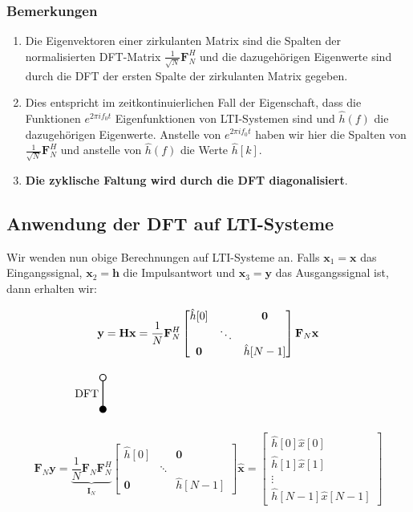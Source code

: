 \documentclass[11pt]{article}
\newcommand{\verticaltransform}[4]{%
    \begin{tikzpicture}
        \filldraw[thick] (0,0) circle (0.1) node[below=3pt] {$#4$};
        \draw[thick] (0,0.1) -- (0,#2 -0.1) node[midway, left] {#1};
        \draw[thick] (0,#2) circle (0.1) node[above=3pt] {$#3$};
    \end{tikzpicture}%
}
\begin{document}
\subsubsection*{Bemerkungen}

\begin{enumerate}
    \item Die Eigenvektoren einer zirkulanten Matrix sind die Spalten der normalisierten DFT-Matrix $\frac{1}{\sqrt{N}}\mathbf{F}_N^H$ und die dazugehörigen Eigenwerte sind durch die DFT der ersten Spalte der zirkulanten Matrix gegeben. 
    \item Dies entspricht im zeitkontinuierlichen Fall der Eigenschaft, dass die
    Funktionen $e^{2 \pi i f_0 t}$ Eigenfunktionen von LTI-Systemen sind und $\hat{h}(f)$ die dazugehörigen Eigenwerte. Anstelle von $e^{2 \pi i f_0 t}$ haben wir hier die Spalten von $\frac{1}{\sqrt{N}}\mathbf{F}_N^H$ und anstelle von $\hat{h}(f)$ die Werte $\hat{h}[k]$.
    \item \textbf{Die zyklische Faltung wird durch die DFT diagonalisiert}.
\end{enumerate}


\subsection*{Anwendung der DFT auf LTI-Systeme}
\vspace*{-0.5cm}

Wir wenden nun obige Berechnungen auf LTI-Systeme an. Falls $\mathbf{x}_1 = \mathbf{x}$ das Eingangssignal, $\mathbf{x}_2 = \mathbf{h}$ die Impulsantwort und $\mathbf{x}_3 = \mathbf{y}$ das Ausgangssignal ist, dann erhalten wir:

\pagebreak

$$\vspace*{-0.75cm}\mathbf{y} = \mathbf{H}\mathbf{x} =  \frac{1}{N} \mathbf{F}_N^H  \begin{bmatrix}
    \hat{h}[0] & & \mathbf{0} \\
    & \ddots & \\
    \mathbf{0} & & \hat{h}[N-1]
\end{bmatrix} \mathbf{F}_N \mathbf{x}$$
$$\vspace*{-1cm}\verticaltransform{\text{DFT}}{1}{}{} \hspace{7.5cm}$$
$$\mathbf{F}_N \mathbf{y} = \underbrace{\frac{1}{N} \mathbf{F}_N \mathbf{F}_N^H}_{\mathbf{I}_N}  \begin{bmatrix}
    \hat{h}[0] & & \mathbf{0} \\
    & \ddots & \\
    \mathbf{0} & & \hat{h}[N-1]
\end{bmatrix} \hat{\mathbf{x}} = \begin{bmatrix}
    \hat{h}[0] \hat{x}[0] \\
    \hat{h}[1] \hat{x}[1] \\
    \vdots \\
    \hat{h}[N-1] \hat{x}[N-1]
\end{bmatrix}$$
\end{document}
